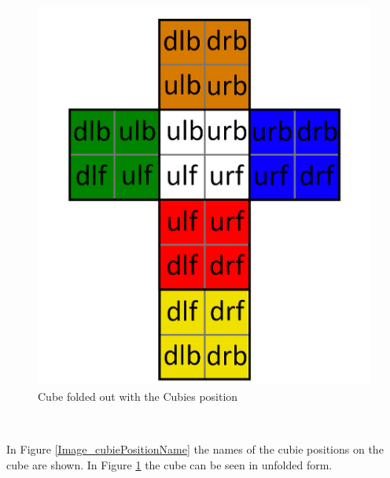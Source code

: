 \documentclass[12pt,a4paper]{article}
\theoremstyle{custom}
\begin{document}
\begin{minipage}[b][][b]{0.43\textwidth}
\end{minipage}\begin{minipage}[b][][b]{0.06\textwidth}$\ $ \end{minipage}\begin{minipage}[b][][b]{0.43\textwidth}

\begin{figure}[H]
\centering
\includegraphics[scale=0.2]{foldedout_cage.png}
\caption[Cube folded out with the names of the cubie positions]{Cube folded out with the Cubies position}
\label{Cubie pos. folded out}
\end{figure}

\end{minipage}\begin{minipage}[b][][b]{0.04\textwidth}$\ $ \end{minipage}

In Figure \ref{Image_cubiePositionName} the names of the cubie positions on the cube are shown. In Figure \ref{Cubie pos. folded out} the cube can be seen in unfolded form. 
\end{document}
